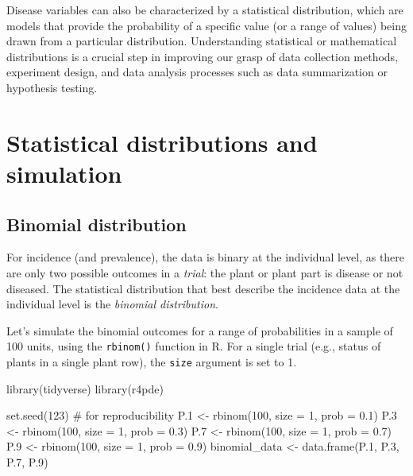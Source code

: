 \documentclass[
  letterpaper,
]{book}
\newenvironment{Shaded}{\begin{snugshade}}{\end{snugshade}}
\newcommand{\AttributeTok}[1]{\textcolor[rgb]{0.40,0.45,0.13}{#1}}
\newcommand{\CommentTok}[1]{\textcolor[rgb]{0.37,0.37,0.37}{#1}}
\newcommand{\DecValTok}[1]{\textcolor[rgb]{0.68,0.00,0.00}{#1}}
\newcommand{\FloatTok}[1]{\textcolor[rgb]{0.68,0.00,0.00}{#1}}
\newcommand{\FunctionTok}[1]{\textcolor[rgb]{0.28,0.35,0.67}{#1}}
\newcommand{\NormalTok}[1]{\textcolor[rgb]{0.00,0.23,0.31}{#1}}
\newcommand{\OtherTok}[1]{\textcolor[rgb]{0.00,0.23,0.31}{#1}}
\begin{document}
Disease variables can also be characterized by a statistical
distribution, which are models that provide the probability of a
specific value (or a range of values) being drawn from a particular
distribution. Understanding statistical or mathematical distributions is
a crucial step in improving our grasp of data collection methods,
experiment design, and data analysis processes such as data
summarization or hypothesis testing.

\hypertarget{statistical-distributions-and-simulation}{%
\section{Statistical distributions and
simulation}\label{statistical-distributions-and-simulation}}

\hypertarget{binomial-distribution}{%
\subsection{Binomial distribution}\label{binomial-distribution}}

For incidence (and prevalence), the data is binary at the individual
level, as there are only two possible outcomes in a \emph{trial}: the
plant or plant part is disease or not diseased. The statistical
distribution that best describe the incidence data at the individual
level is the \emph{binomial distribution}.

Let's simulate the binomial outcomes for a range of probabilities in a
sample of 100 units, using the \texttt{rbinom()} function in R. For a
single trial (e.g., status of plants in a single plant row), the
\texttt{size} argument is set to 1.

\begin{Shaded}
\begin{Highlighting}[]
\FunctionTok{library}\NormalTok{(tidyverse)}
\FunctionTok{library}\NormalTok{(r4pde)}


\FunctionTok{set.seed}\NormalTok{(}\DecValTok{123}\NormalTok{) }\CommentTok{\# for reproducibility}
\NormalTok{P}\FloatTok{.1} \OtherTok{\textless{}{-}} \FunctionTok{rbinom}\NormalTok{(}\DecValTok{100}\NormalTok{, }\AttributeTok{size =} \DecValTok{1}\NormalTok{, }\AttributeTok{prob =} \FloatTok{0.1}\NormalTok{)}
\NormalTok{P}\FloatTok{.3} \OtherTok{\textless{}{-}} \FunctionTok{rbinom}\NormalTok{(}\DecValTok{100}\NormalTok{, }\AttributeTok{size =} \DecValTok{1}\NormalTok{, }\AttributeTok{prob =} \FloatTok{0.3}\NormalTok{)}
\NormalTok{P}\FloatTok{.7} \OtherTok{\textless{}{-}} \FunctionTok{rbinom}\NormalTok{(}\DecValTok{100}\NormalTok{, }\AttributeTok{size =} \DecValTok{1}\NormalTok{, }\AttributeTok{prob =} \FloatTok{0.7}\NormalTok{)}
\NormalTok{P}\FloatTok{.9} \OtherTok{\textless{}{-}} \FunctionTok{rbinom}\NormalTok{(}\DecValTok{100}\NormalTok{, }\AttributeTok{size =} \DecValTok{1}\NormalTok{, }\AttributeTok{prob =} \FloatTok{0.9}\NormalTok{)}
\NormalTok{binomial\_data }\OtherTok{\textless{}{-}} \FunctionTok{data.frame}\NormalTok{(P}\FloatTok{.1}\NormalTok{, P}\FloatTok{.3}\NormalTok{, P}\FloatTok{.7}\NormalTok{, P}\FloatTok{.9}\NormalTok{)}
\end{Highlighting}
\end{Shaded}
\end{document}
